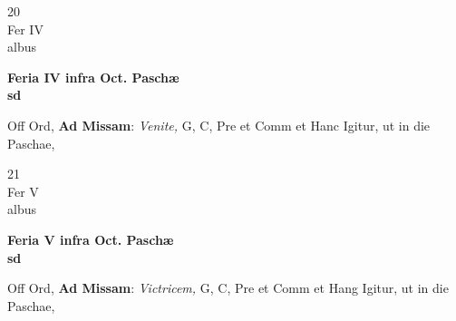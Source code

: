\documentclass[10pt, openany]{book}
\begin{document}
        \begin{center}
            \begin{minipage}{3.5in}
                \vspace{2em}
                \begin{minipage}{0.5in}
                    {\Huge 20} \\
                    {\normalsize Fer IV} \\
                    {\normalsize albus}
                \end{minipage}
                \begin{minipage}{3.0in}
                    \textbf{ \large Feria IV infra Oct. Paschæ \\
                    \textnormal{\normalsize sd}} \\ 
                \end{minipage}
                \begin{justify}Off Ord, \textbf{Ad Missam}: \textit{Venite,} G, C, Pre et Comm et Hanc Igitur, ut in die Paschae,  
                \end{justify}
            \end{minipage}
        \end{center}
    
        \begin{center}
            \begin{minipage}{3.5in}
                \vspace{2em}
                \begin{minipage}{0.5in}
                    {\Huge 21} \\
                    {\normalsize Fer V} \\
                    {\normalsize albus}
                \end{minipage}
                \begin{minipage}{3.0in}
                    \textbf{ \large Feria V infra Oct. Paschæ \\
                    \textnormal{\normalsize sd}} \\ 
                \end{minipage}
                \begin{justify}Off Ord, \textbf{Ad Missam}: \textit{Victricem,} G, C, Pre et Comm et Hang Igitur, ut in die Paschae,  
                \end{justify}
            \end{minipage}
        \end{center}
    
\end{document}
